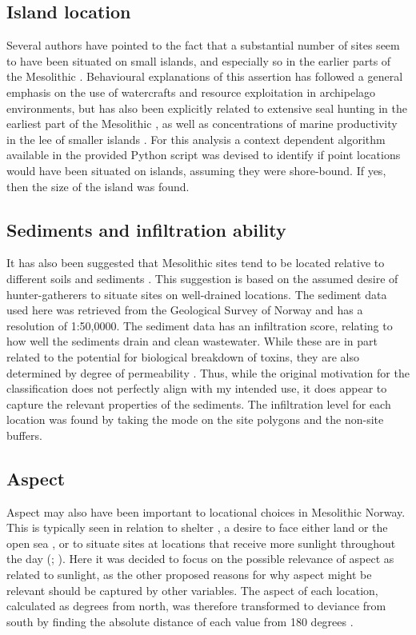 \documentclass[12pt, a4paper]{article}
\begin{document}
\subsection{Island location}
Several authors have pointed to the fact that a substantial number of sites seem to have been situated on small islands, and especially so in the earlier parts of the Mesolithic \citep[e.g.][]{nyland2012, bjerck2013, bjerck2017}. Behavioural explanations of this assertion has followed a general emphasis on the use of watercrafts and resource exploitation in archipelago environments, but has also been explicitly related to extensive seal hunting in the earliest part of the Mesolithic \citep{bjerck2017}, as well as concentrations of marine productivity in the lee of smaller islands \citep{breivik2014,schmitt2015}. For this analysis a context dependent algorithm available in the provided Python script was devised to identify if point locations would have been situated on islands, assuming they were shore-bound. If yes, then the size of the island was found.

\subsection{Sediments and infiltration ability}
It has also been suggested that Mesolithic sites tend to be located relative to different soils and sediments \citep[see][]{bergsvik1995, berghansen2009}. This suggestion is based on the assumed desire of hunter-gatherers to situate sites on well-drained locations. The sediment data used here was retrieved from the Geological Survey of Norway and has a resolution of 1:50,0000. The sediment data has an infiltration score, relating to how well the sediments drain and clean wastewater. While these are in part related to the potential for biological breakdown of toxins, they are also determined by degree of permeability \citep{ngu2015}. Thus, while the original motivation for the classification does not perfectly align with my intended use, it does appear to capture the relevant properties of the sediments. The infiltration level for each location was found by taking the mode on the site polygons and the non-site buffers. 

\subsection{Aspect}
Aspect may also have been important to locational choices in Mesolithic Norway. This is typically seen in relation to shelter \citep[][47]{berghansen2009}, a desire to face either land or the open sea \citep{darmark2018}, or to situate sites at locations that receive more sunlight throughout the day (\citealp[][58]{mikkelsen1989}; \citealp[][113]{berghansen2009}). Here it was decided to focus on the possible relevance of aspect as related to sunlight, as the other proposed reasons for why aspect might be relevant should be captured by other variables. The aspect of each location, calculated as degrees from north, was therefore transformed to deviance from south by finding the absolute distance of each value from 180 degrees \citep[][]{spencer2018}. 
\end{document}
